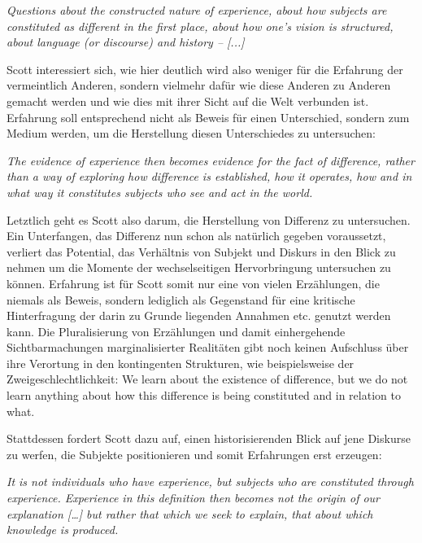 \begin{myenv}
  \textit{\glqq Questions about the constructed nature of experience, about how
  subjects are constituted as different in the first place, about how one's
vision is structured, about language (or discourse) and history – [...]\grqq}
\footnotemark {}
\end{myenv}

Scott interessiert sich, wie hier deutlich wird also weniger für die Erfahrung
der vermeintlich Anderen, sondern vielmehr dafür wie diese Anderen zu Anderen
gemacht werden und wie dies mit ihrer Sicht auf die Welt verbunden ist.
Erfahrung soll entsprechend nicht als Beweis für einen Unterschied, sondern zum
Medium werden, um die Herstellung diesen Unterschiedes zu untersuchen:
\begin{myenv}
  \textit{\glqq 
   The evidence of experience then becomes evidence for the fact of difference, rather than a way of exploring how difference is established, how it operates, how and in what way it constitutes subjects who see and act in the world. 
    \grqq}
\footnotemark {}
\end{myenv}

Letztlich geht es Scott also darum, die Herstellung von Differenz zu
untersuchen. Ein Unterfangen, das Differenz nun schon als natürlich gegeben
voraussetzt, verliert das Potential, das Verhältnis von Subjekt und Diskurs in
den Blick zu nehmen um die Momente der wechselseitigen Hervorbringung
untersuchen zu können. Erfahrung ist für Scott somit nur eine von vielen
Erzählungen, die niemals als Beweis, sondern lediglich als Gegenstand für eine
kritische Hinterfragung der darin zu Grunde liegenden Annahmen etc. genutzt
werden kann. Die Pluralisierung von Erzählungen und damit einhergehende
Sichtbarmachungen marginalisierter Realitäten gibt noch keinen Aufschluss über
ihre Verortung in den kontingenten Strukturen, wie beispielsweise der
Zweigeschlechtlichkeit: \glqq We learn about the existence of difference, but we do
not learn anything about how this difference is being constituted and in
relation to what.\grqq \footnotemark {}
    
Stattdessen fordert Scott dazu auf, einen historisierenden Blick auf jene Diskurse zu werfen, die Subjekte positionieren und somit Erfahrungen erst erzeugen:

\begin{myenv}
  \textit{\glqq 
It is not individuals who have experience, but subjects who are constituted through experience. Experience in this definition then becomes not the origin of our explanation […] but rather that which we seek to explain, that about which knowledge is produced.
    \grqq}
\footnotemark {}
\end{myenv}

